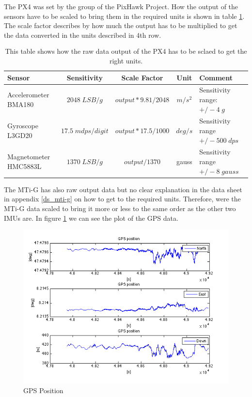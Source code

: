 The PX4 was set by the group of the PixHawk Project. How the output of the sensors have to be scaled to bring them in the required units is shown in table \ref{ct_units_PX4}. The scale factor describes by how much the output has to be multiplied to get the data converted in the units described in 4th row.
\begin{table}[h]
\centering
\begin{tabular}{|p{2.5 cm}|c|c|c|p{3 cm}|}
 \hline
 Sensor & Sensitivity & Scale Factor & Unit & Comment \\
 \hline
 Accelerometer BMA180 & $2048\;LSB/g$ & $output*9.81/2048$ & $m/s^2$ &     Sensitivity range: $+/- 4\;g$ \\
 \hline
 Gyroscope L3GD20 & $17.5\;mdps/digit$ & $output*17.5/1000$ & $deg/s$ &  Sensitivity range $+/- 500\;dps$ \\
 \hline
 Magnetometer HMC5883L & $1370\;LSB/g$ & $output/1370$ & gauss &   Sensitivity range $+/-8\;gauss$\\
\hline
\end {tabular}
\caption{This table shows how the raw data output of the PX4 has to be sclaed to get the right units.}
\label{ct_units_PX4}
\end{table}
The MTi-G has also raw output data but no clear explanation in the data sheet in appendix \ref{ds_mti-g} on how to get to the required units. Therefore, were the MTi-G data scaled to bring it more or less to the same order as the other two IMUs are.
In figure \ref{ct_pos} we can see the plot of the GPS data.
\begin{figure}[hb]
\begin{center}
\includegraphics[width=1\textwidth]{pictures/ct_pos.png}
\caption{GPS Position}
\label{ct_pos}
\end{center}
\end{figure}
